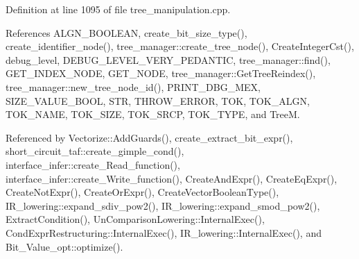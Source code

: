 Definition at line 1095 of file tree\+\_\+manipulation.\+cpp.



References A\+L\+G\+N\+\_\+\+B\+O\+O\+L\+E\+AN, create\+\_\+bit\+\_\+size\+\_\+type(), create\+\_\+identifier\+\_\+node(), tree\+\_\+manager\+::create\+\_\+tree\+\_\+node(), Create\+Integer\+Cst(), debug\+\_\+level, D\+E\+B\+U\+G\+\_\+\+L\+E\+V\+E\+L\+\_\+\+V\+E\+R\+Y\+\_\+\+P\+E\+D\+A\+N\+T\+IC, tree\+\_\+manager\+::find(), G\+E\+T\+\_\+\+I\+N\+D\+E\+X\+\_\+\+N\+O\+DE, G\+E\+T\+\_\+\+N\+O\+DE, tree\+\_\+manager\+::\+Get\+Tree\+Reindex(), tree\+\_\+manager\+::new\+\_\+tree\+\_\+node\+\_\+id(), P\+R\+I\+N\+T\+\_\+\+D\+B\+G\+\_\+\+M\+EX, S\+I\+Z\+E\+\_\+\+V\+A\+L\+U\+E\+\_\+\+B\+O\+OL, S\+TR, T\+H\+R\+O\+W\+\_\+\+E\+R\+R\+OR, T\+OK, T\+O\+K\+\_\+\+A\+L\+GN, T\+O\+K\+\_\+\+N\+A\+ME, T\+O\+K\+\_\+\+S\+I\+ZE, T\+O\+K\+\_\+\+S\+R\+CP, T\+O\+K\+\_\+\+T\+Y\+PE, and TreeM.



Referenced by Vectorize\+::\+Add\+Guards(), create\+\_\+extract\+\_\+bit\+\_\+expr(), short\+\_\+circuit\+\_\+taf\+::create\+\_\+gimple\+\_\+cond(), interface\+\_\+infer\+::create\+\_\+\+Read\+\_\+function(), interface\+\_\+infer\+::create\+\_\+\+Write\+\_\+function(), Create\+And\+Expr(), Create\+Eq\+Expr(), Create\+Not\+Expr(), Create\+Or\+Expr(), Create\+Vector\+Boolean\+Type(), I\+R\+\_\+lowering\+::expand\+\_\+sdiv\+\_\+pow2(), I\+R\+\_\+lowering\+::expand\+\_\+smod\+\_\+pow2(), Extract\+Condition(), Un\+Comparison\+Lowering\+::\+Internal\+Exec(), Cond\+Expr\+Restructuring\+::\+Internal\+Exec(), I\+R\+\_\+lowering\+::\+Internal\+Exec(), and Bit\+\_\+\+Value\+\_\+opt\+::optimize().

